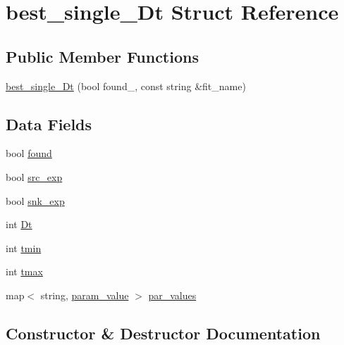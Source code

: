 \hypertarget{structbest__single__Dt}{}\section{best\+\_\+single\+\_\+\+Dt Struct Reference}
\label{structbest__single__Dt}
\subsection*{Public Member Functions}
\begin{DoxyCompactItemize}
\item 
\mbox{\hyperlink{structbest__single__Dt_a36d709878d3d07f68b32f81c23656e3c}{best\+\_\+single\+\_\+\+Dt}} (bool found\+\_\+, const string \&fit\+\_\+name)
\end{DoxyCompactItemize}
\subsection*{Data Fields}
\begin{DoxyCompactItemize}
\item 
bool \mbox{\hyperlink{structbest__single__Dt_adfee5d068623979447ca1a0dd6177ebd}{found}}
\item 
bool \mbox{\hyperlink{structbest__single__Dt_ad32a09f26adf34121c258bf1234da1f8}{src\+\_\+exp}}
\item 
bool \mbox{\hyperlink{structbest__single__Dt_ae9aa73684aaa8ce25e65313006c08d06}{snk\+\_\+exp}}
\item 
int \mbox{\hyperlink{structbest__single__Dt_aea32341d99f8b6a35cbf45ee672dfa85}{Dt}}
\item 
int \mbox{\hyperlink{structbest__single__Dt_aa41c8d5882c59f2ddd877e18971a7276}{tmin}}
\item 
int \mbox{\hyperlink{structbest__single__Dt_a31995288cfd0198e222aba9b153e9a33}{tmax}}
\item 
map$<$ string, \mbox{\hyperlink{structparam__value}{param\+\_\+value}} $>$ \mbox{\hyperlink{structbest__single__Dt_a2ce3cb716e6645217b376f6278671392}{par\+\_\+values}}
\end{DoxyCompactItemize}


\subsection{Constructor \& Destructor Documentation}
\mbox{\label{structbest__single__Dt_a36d709878d3d07f68b32f81c23656e3c}} 
